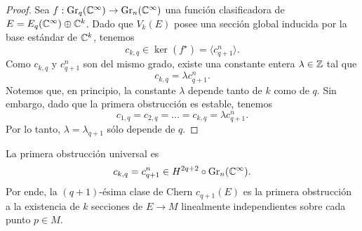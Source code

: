 \begin{proof}
Sea $f : \operatorname{Gr}_q(\mathbb C^\infty) \to \operatorname{Gr}_n(\mathbb C^\infty)$ una función clasificadora de $E = E_q(\mathbb C^\infty) \oplus \mathbb C^k$. Dado que $V_k(E)$ posee una sección global inducida por la base estándar de $\mathbb C^k$, tenemos
$$c_{k,q} \in \ker(f^\star) = \langle c_{q+1}^n \rangle.$$
Como $c_{k,q}$ y $c_{q+1}^n$ son del mismo grado, existe una constante entera $\lambda \in \mathbb Z$ tal que
$$c_{k,q} = \lambda c_{q+1}^n.$$
Notemos que, en principio, la constante $\lambda$ depende tanto de $k$ como de $q$. Sin embargo, dado que la primera obstrucción es estable, tenemos
$$c_{1,q} = c_{2,q} = \dots = c_{k,q} = \lambda c_{q+1}^n.$$
Por lo tanto, $\lambda = \lambda_{q+1}$ sólo depende de $q$.
\end{proof}

\begin{theorem}
La primera obstrucción universal es
$$c_{k,q} = c_{q+1}^n \in H^{2q+2} \circ \operatorname{Gr}_n(\mathbb C^\infty).$$
Por ende, la $(q+1)$-ésima clase de Chern $c_{q+1}(E)$ es la primera obstrucción a la existencia de $k$ secciones de $E \to M$ linealmente independientes sobre cada punto $p \in M$.
\end{theorem}

